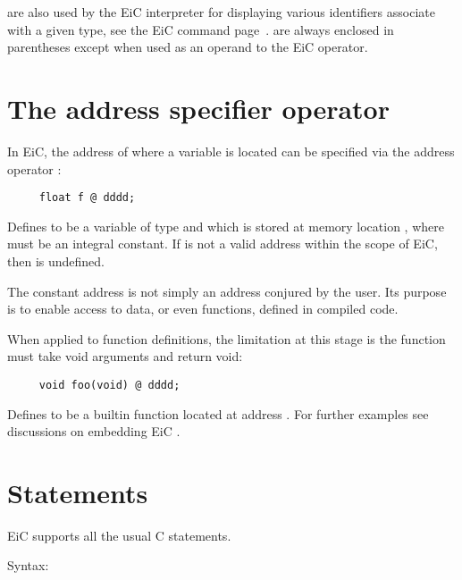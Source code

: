  are also used by the EiC interpreter for displaying
various identifiers associate with a given type, see the EiC
 command page~\pageref{item:variables}.
 are always enclosed in parentheses except when
used as an operand to the EiC  operator.
 

\section{The address specifier operator }
\label{sec:address_specifier}

In EiC, the address of where a variable is located can be specified
via the address operator :

\begin{production}
\begin{verbatim}
     float f @ dddd; 
\end{verbatim}
\end{production}

Defines  to be a variable of type  and which is stored
at memory location , where  must be an integral
constant. If  is not a valid address within the scope of EiC, then
 is undefined.

The constant address  is not simply an address conjured by the
user. Its purpose is to enable access to data, or even functions,
defined in compiled code. 

When applied to function definitions, the limitation at this stage is
the function must take void arguments and return void:

\begin{production}
\begin{verbatim}
     void foo(void) @ dddd; 
\end{verbatim}
\end{production}

Defines  to be a builtin function located at address
. For further examples see discussions on
embedding EiC .

\section{Statements}
\label{sec:statements}

EiC supports all the usual C statements.

Syntax:

